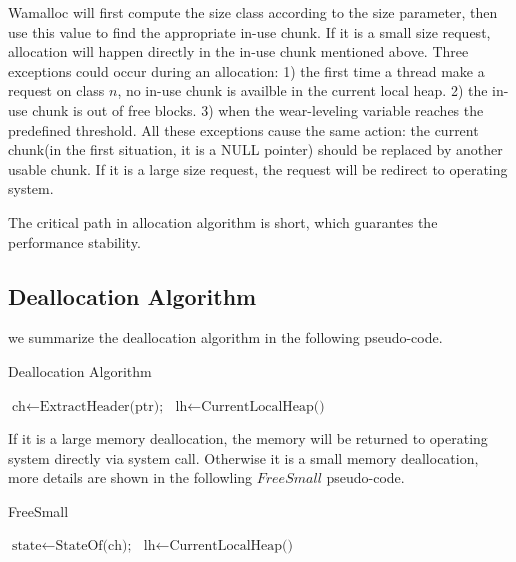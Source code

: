 \documentclass{vldb}
\begin{document}
Wamalloc will first compute the size class according to the size parameter, 
then use this value to find the appropriate in-use chunk.
If it is a small size request, allocation will happen directly in the in-use chunk mentioned above.
Three exceptions could occur during an allocation:
1) the first time a thread make a request on class $n$, no in-use chunk is availble in the current local heap.
2) the in-use chunk is out of free blocks.
3) when the wear-leveling variable reaches the predefined threshold.
All these exceptions cause the same action: the current chunk(in the first situation, it is a NULL pointer) should be replaced by another usable chunk.
If it is a large size request, the request will be redirect to operating system.

The critical path in allocation algorithm is short, which guarantes the performance stability.

\subsection{Deallocation Algorithm}

we summarize the deallocation algorithm in the following pseudo-code.

\begin{algorithm}
\caption{Deallocation Algorithm}\label{euclid}
\begin{algorithmic}[1]

\State $\text{ch} \gets \text{ExtractHeader(ptr);}$
\State $\text{lh} \gets \text{CurrentLocalHeap()}$

\State {}
\Else
\State {}
\EndIf

\EndProcedure
\end{algorithmic}
\end{algorithm}

If it is a large memory deallocation, the memory will be returned to operating system directly via system call.
Otherwise it is a small memory deallocation, more details are shown in the followling $FreeSmall$ pseudo-code.

\begin{algorithm}
\caption{FreeSmall}
\begin{algorithmic}
\State {}
\State $\text{state} \gets \text{StateOf(ch);}$
\State $\text{lh} \gets \text{CurrentLocalHeap()}$

    \State {}
    \State {}
        \State {}
    \EndIf
{}
        \State {}
    \EndIf
\Else
    \State {}
\EndIf

\EndProcedure
\end{algorithmic}
\end{algorithm}
\end{document}

